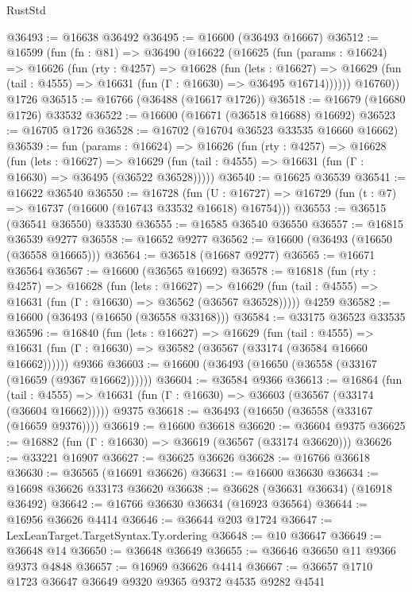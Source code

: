 \begin{lexlean}{RustStd}
\begin{coremodule}
{\begin{coremodule}
{{{{{{{{{{{{{{{{{{{{{{{{{{{{{{{{{{{{{{{{{{{{{{{{{{{{{{{@36493 := @16638 @36492
@36495 := @16600 (@36493 @16667)
@36512 := @16599
    (fun (fn : @81) =>
    @36490
      (@16622
        (@16625
          (fun (params : @16624) =>
          @16626
            (fun (rty : @4257) =>
            @16628
              (fun (lets : @16627) =>
              @16629 (fun (tail : @4555) => @16631 (fun (Γ : @16630) => @36495 @16714))))))
        @16760))
    @1726
@36515 := @16766 (@36488 (@16617 @1726))
@36518 := @16679 (@16680 @1726) @33532
@36522 := @16600 (@16671 (@36518 @16688) @16692)
@36523 := @16705 @1726
@36528 := @16702 (@16704 @36523 @33535 @16660 @16662)
@36539 := fun (params : @16624) =>
  @16626
    (fun (rty : @4257) =>
    @16628
      (fun (lets : @16627) =>
      @16629 (fun (tail : @4555) => @16631 (fun (Γ : @16630) => @36495 (@36522 @36528)))))
@36540 := @16625 @36539
@36541 := @16622 @36540
@36550 := @16728
    (fun (U : @16727) => @16729 (fun (t : @7) => @16737 (@16600 (@16743 @33532 @16618) @16754)))
@36553 := @36515 (@36541 @36550) @33530
@36555 := @16585 @36540 @36550
@36557 := @16815 @36539 @9277
@36558 := @16652 @9277
@36562 := @16600 (@36493 (@16650 (@36558 @16665)))
@36564 := @36518 (@16687 @9277)
@36565 := @16671 @36564
@36567 := @16600 (@36565 @16692)
@36578 := @16818
    (fun (rty : @4257) =>
    @16628
      (fun (lets : @16627) =>
      @16629 (fun (tail : @4555) => @16631 (fun (Γ : @16630) => @36562 (@36567 @36528)))))
    @4259
@36582 := @16600 (@36493 (@16650 (@36558 @33168)))
@36584 := @33175 @36523 @33535
@36596 := @16840
    (fun (lets : @16627) =>
    @16629
      (fun (tail : @4555) =>
      @16631 (fun (Γ : @16630) => @36582 (@36567 (@33174 (@36584 @16660 @16662))))))
    @9366
@36603 := @16600 (@36493 (@16650 (@36558 (@33167 (@16659 (@9367 @16662))))))
@36604 := @36584 @9366
@36613 := @16864
    (fun (tail : @4555) => @16631 (fun (Γ : @16630) => @36603 (@36567 (@33174 (@36604 @16662)))))
    @9375
@36618 := @36493 (@16650 (@36558 (@33167 (@16659 @9376))))
@36619 := @16600 @36618
@36620 := @36604 @9375
@36625 := @16882 (fun (Γ : @16630) => @36619 (@36567 (@33174 @36620)))
@36626 := @33221 @16907
@36627 := @36625 @36626
@36628 := @16766 @36618
@36630 := @36565 (@16691 @36626)
@36631 := @16600 @36630
@36634 := @16698 @36626 @33173 @36620
@36638 := @36628 (@36631 @36634) (@16918 @36492)
@36642 := @16766 @36630 @36634 (@16923 @36564)
@36644 := @16956 @36626 @4414
@36646 := @36644 @203 @1724
@36647 := LexLeanTarget.TargetSyntax.Ty.ordering
@36648 := @10 @36647
@36649 := @36648 @14
@36650 := @36648 @36649
@36655 := @36646 @36650 @11 @9366 @9373 @4848
@36657 := @16969 @36626 @4414
@36667 := @36657 @1710 @1723 @36647 @36649 @9320 @9365 @9372 @4535 @9282 @4541
}}}}}}}}}}}}}}}}}}}}}}}}}}}}}}}}}}}}}}}}}}}}}}}}}}}}}}}
\end{coremodule}}
\end{coremodule}
\end{lexlean}
